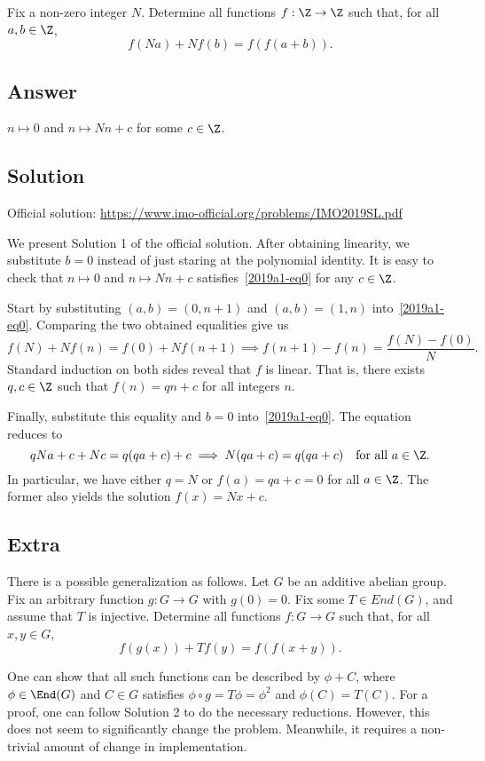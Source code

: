 Fix a non-zero integer $N$.
Determine all functions $f : \Z \to \Z$ such that, for all $a, b \in \Z$,
\[ f(Na) + N f(b) = f(f(a + b)). \tag{*}\label{2019a1-eq0} \]



\subsection*{Answer}

$n \mapsto 0$ and $n \mapsto Nn + c$ for some $c \in \Z$.



\subsection*{Solution}

Official solution: \url{https://www.imo-official.org/problems/IMO2019SL.pdf}

We present Solution 1 of the official solution.
After obtaining linearity, we substitute $b = 0$ instead of just staring at the polynomial identity.
It is easy to check that $n \mapsto 0$ and $n \mapsto Nn + c$ satisfies~\eqref{2019a1-eq0} for any $c \in \Z$.

Start by substituting $(a, b) = (0, n + 1)$ and $(a, b) = (1, n)$ into~\eqref{2019a1-eq0}.
Comparing the two obtained equalities give us
\[ f(N) + N f(n) = f(0) + N f(n + 1) \implies f(n + 1) - f(n) = \frac{f(N) - f(0)}{N}. \]
Standard induction on both sides reveal that $f$ is linear.
That is, there exists $q, c \in \Z$ such that $f(n) = qn + c$ for all integers $n$.

Finally, substitute this equality and $b = 0$ into~\eqref{2019a1-eq0}.
The equation reduces to
\[ qNa + c + Nc = q(qa + c) + c \implies N(qa + c) = q(qa + c) \quad \text{for all } a \in \Z. \]
In particular, we have either $q = N$ or $f(a) = qa + c = 0$ for all $a \in \Z$.
The former also yields the solution $f(x) = Nx + c$.



\subsection*{Extra}

There is a possible generalization as follows.
Let $G$ be an additive abelian group.
Fix an arbitrary function $g : G \to G$ with $g(0) = 0$.
Fix some $T \in End(G)$, and assume that $T$ is injective.
Determine all functions $f : G \to G$ such that, for all $x, y \in G$,
\[ f(g(x)) + T f(y) = f(f(x + y)). \]

One can show that all such functions can be described by $\phi + C$, where $\phi \in \End(G)$ and $C \in G$ satisfies $\phi \circ g = T \phi = \phi^2$ and $\phi(C) = T(C)$.
For a proof, one can follow Solution 2 to do the necessary reductions.
However, this does not seem to significantly change the problem.
Meanwhile, it requires a non-trivial amount of change in implementation.
